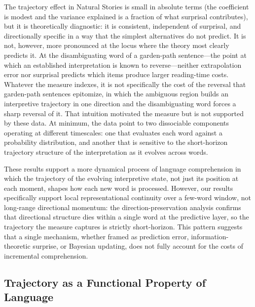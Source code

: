 \documentclass[12pt]{article}
\newcommand{\new}[1]{#1}   %
\begin{document}
The trajectory effect in Natural Stories is small in absolute terms (the coefficient is modest and the variance explained is a fraction of what surprisal contributes), but it is theoretically diagnostic: it is consistent, independent of surprisal, and directionally specific in a way that the simplest alternatives do not predict. \new{It is not, however, more pronounced at the locus where the theory most clearly predicts it. At the disambiguating word of a garden-path sentence---the point at which an established interpretation is known to reverse---neither extrapolation error nor surprisal predicts which items produce larger reading-time costs. Whatever the measure indexes, it is not specifically the cost of the reversal that garden-path sentences epitomize, in which the ambiguous region builds an interpretive trajectory in one direction and the disambiguating word forces a sharp reversal of it. That intuition motivated the measure but is not supported by these data.} At minimum, the data point to two dissociable components operating at different timescales: one that evaluates each word against a probability distribution, and another that is sensitive to the short-horizon trajectory structure of the interpretation as it evolves across words.

These results support a more dynamical process of language comprehension in which the trajectory of the evolving interpretive state, not just its position at each moment, shapes how each new word is processed. However, our results specifically support local representational continuity over a few-word window, not long-range directional momentum: the direction-preservation analysis confirms that directional structure dies within a single word at the predictive layer, so the trajectory the measure captures is strictly short-horizon. This pattern suggests that a single mechanism, whether framed as prediction error, information-theoretic surprise, or Bayesian updating, does not fully account for the costs of incremental comprehension.

\subsection{Trajectory as a Functional Property of Language}
\end{document}
